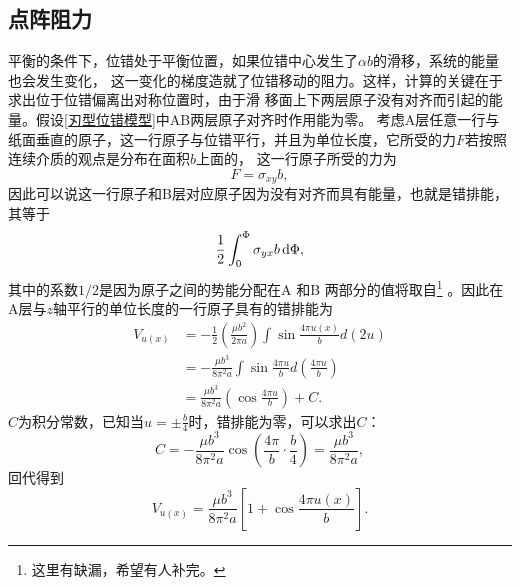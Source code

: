             \subsection{点阵阻力}
                平衡的条件下，位错处于平衡位置，如果位错中心发生了$\alpha b$的滑移，系统的能量也会发生变化，
                这一变化的梯度造就了位错移动的阻力。这样，计算的关键在于求出位于位错偏离出对称位置时，由于滑
                移面上下两层原子没有对齐而引起的能量。假设\autoref{刃型位错模型}中AB两层原子对齐时作用能为零。
                考虑A层任意一行与纸面垂直的原子，这一行原子与位错平行，并且为单位长度，它所受的力$F$若按照
                连续介质的观点是分布在面积$b$上面的，
                这一行原子所受的力为
                \begin{equation}
                    F=\sigma_{xy}b\label{位错核心受到的力与柏式矢量关系},
                \end{equation}
                因此可以说这一行原子和B层对应原子因为没有对齐而具有能量，也就是错排能，其等于
                \begin{equation}
                    \frac{1}{2}\int_{0}^{\Phi}\sigma_{yx}b\mathop{}\!\mathrm{d} \Phi,
                \end{equation}
                其中的系数$1/2$是因为原子之间的势能分配在A 和B 两部分的值将取自\footnote{这里有缺漏，希望有人补完。}
                。因此在A层与$z$轴平行的单位长度的一行原子具有的错排能为
                \begin{equation}
                    \begin{aligned}
                        V_{u(x)}&=-\frac{1}{2}\left(\frac{\mu b^{2}}{2 \pi a}\right) \int \sin \frac{4 \pi u(x)}{b} d(2 u) \\ 
                            &=-\frac{\mu b^{3}}{8 \pi^{2} a} \int \sin \frac{4 \pi u}{b} d\left(\frac{4 \pi u}{b}\right) \\ 
                            &=\frac{\mu b^{3}}{8 \pi^{2} a}\left(\cos \frac{4 \pi u}{b}\right)+C.
                    \end{aligned}
                \end{equation}
                $C$为积分常数，已知当$u=\pm\frac{b}{4}$时，错排能为零，可以求出$C$：
                \begin{equation}
                    C=-\frac{\mu b^{3}}{8 \pi^{2} a} \cos \left(\frac{4 \pi}{b} \cdot \frac{b}{4}\right)=\frac{\mu b^{3}}{8 \pi^{2} a},
                \end{equation}
                回代得到
                \begin{equation}
                    V_{u(x)}=\frac{\mu b^{3}}{8 \pi^{2} a}\left[1+\cos \frac{4 \pi u(x)}{b}\right].
                \end{equation}
